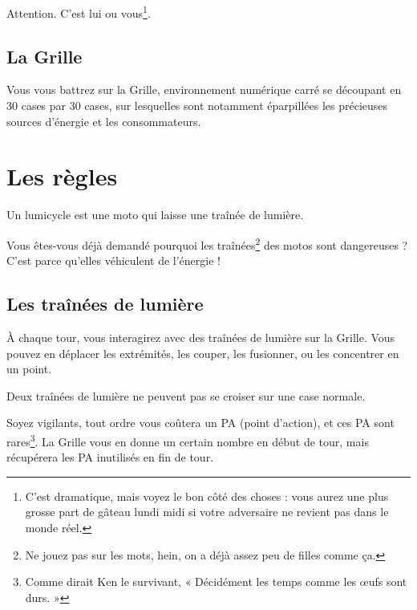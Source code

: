 Attention. C'est lui ou vous\footnote{C'est dramatique, mais voyez le bon côté des choses : vous aurez une plus grosse part de gâteau lundi midi si votre adversaire ne revient pas dans le monde réel.}.

\subsection{La Grille}


Vous vous battrez sur la Grille, environnement numérique carré se découpant en 30 cases par 30 cases, sur lesquelles sont notamment éparpillées les précieuses sources d'énergie et les consommateurs.

\newpage
\section{Les règles}

Un lumicycle est une moto qui laisse une traînée de lumière.

Vous êtes-vous déjà demandé pourquoi les traînées\footnote{Ne jouez pas sur les mots, hein, on a déjà assez peu de filles comme ça.} des motos sont dangereuses ? C'est parce qu'elles véhiculent de l'énergie !

        \subsection{Les traînées de lumière}

À chaque tour, vous interagirez avec des traînées de lumière sur la Grille. Vous pouvez en déplacer les extrémités, les couper, les fusionner, ou les concentrer en un point.

Deux traînées de lumière ne peuvent pas se croiser sur une case normale.

Soyez vigilants, tout ordre vous coûtera un PA (point d'action), et ces PA sont rares\footnote{Comme dirait Ken le survivant, « Décidément les temps comme les œufs sont durs. »}. La Grille vous en donne un certain
nombre en début de tour, mais récupérera les PA inutilisés en fin de tour.


